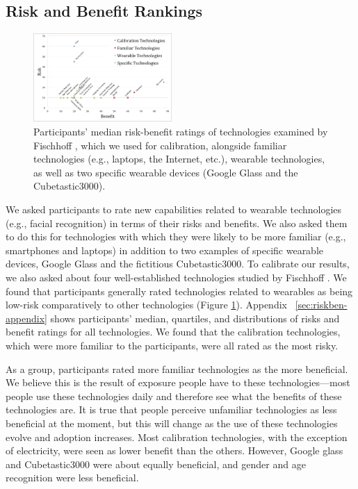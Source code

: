 
\subsection{Risk and Benefit Rankings} 
\begin{figure}[t]
	\centering
	\includegraphics[width=0.47\textwidth]{images/riskbenefit.pdf}
	\caption{Participants' median risk-benefit ratings of technologies examined by Fischhoff \etal\cite{Fischhoff}, which we used for calibration, alongside familiar technologies (e.g., laptops, the Internet, etc.), wearable technologies, as well as two specific wearable devices (Google Glass and the Cubetastic3000).}
	\label{fig:techplot}
\end{figure}

We asked participants to rate new capabilities related to wearable technologies (e.g., facial recognition) in terms of their risks and benefits. We also asked them to do this for technologies with which they were likely to be more familiar (e.g., smartphones and laptops) in addition to two examples of specific wearable devices, Google Glass and the fictitious Cubetastic3000. To calibrate our results, we also asked about four well-established technologies studied by Fischhoff \etal\cite{Fischhoff}. We found that participants generally rated technologies related to wearables as being low-risk comparatively to other technologies (Figure \ref{fig:techplot}). Appendix ~\ref{sec:riskben-appendix} shows participants' median, quartiles, and distributions of risks and benefit ratings for all technologies. We found that the calibration technologies, which were more familiar to the participants, were all rated as the most risky. 

As a group, participants rated more familiar technologies as the more beneficial. We believe this is the result of exposure people have to these technologies---most people use these technologies daily and therefore see what the benefits of these technologies are. It is true that people perceive unfamiliar technologies as less beneficial at the moment, but this will change as the use of these technologies evolve and adoption increases. Most calibration technologies, with the exception of electricity, were seen as lower benefit than the others. However, Google glass and Cubetastic3000 were about equally beneficial, and gender and age recognition were less beneficial. 

